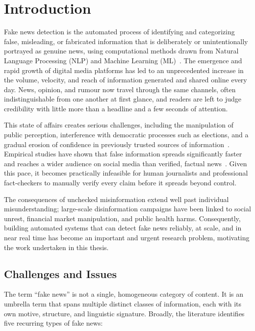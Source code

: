 \sloppy
\chapter{Introduction}

Fake news detection is the automated process of identifying and categorizing false, misleading, or fabricated information that is deliberately or unintentionally portrayed as genuine news, using computational methods drawn from Natural Language Processing (NLP) and Machine Learning (ML)~\citep{Shu2020FakeNewsNet,Shu2017FakeNewsDetection}. The emergence and rapid growth of digital media platforms has led to an unprecedented increase in the volume, velocity, and reach of information generated and shared online every day. News, opinion, and rumour now travel through the same channels, often indistinguishable from one another at first glance, and readers are left to judge credibility with little more than a headline and a few seconds of attention.

This state of affairs creates serious challenges, including the manipulation of public perception, interference with democratic processes such as elections, and a gradual erosion of confidence in previously trusted sources of information~\citep{Shu2020FakeNewsNet,Shu2017FakeNewsDetection}. Empirical studies have shown that false information spreads significantly faster and reaches a wider audience on social media than verified, factual news~\citep{Vosoughi2018Spread}. Given this pace, it becomes practically infeasible for human journalists and professional fact-checkers to manually verify every claim before it spreads beyond control.

The consequences of unchecked misinformation extend well past individual misunderstanding; large-scale disinformation campaigns have been linked to social unrest, financial market manipulation, and public health harms. Consequently, building automated systems that can detect fake news reliably, at scale, and in near real time has become an important and urgent research problem, motivating the work undertaken in this thesis.

\section{Challenges and Issues}

The term ``fake news'' is not a single, homogeneous category of content. It is an umbrella term that spans multiple distinct classes of information, each with its own motive, structure, and linguistic signature. Broadly, the literature identifies five recurring types of fake news:

